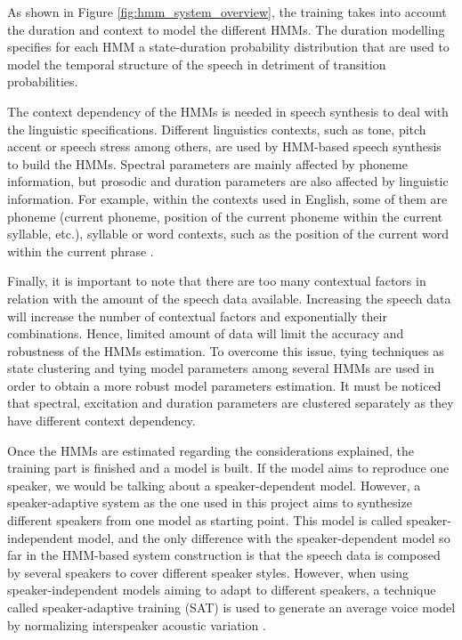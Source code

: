 As shown in Figure \ref{fig:hmm_system_overview}, the training takes into account the duration and context to model the different HMMs.
%
The duration modelling specifies for each HMM a state-duration probability distribution that are used to model the temporal structure of the speech in detriment of transition probabilities.

The context dependency of the HMMs is needed in speech synthesis to deal with the linguistic specifications.
%
Different linguistics contexts, such as tone, pitch accent or speech stress among others, are used by HMM-based speech synthesis to build the HMMs.
%
Spectral parameters are mainly affected by phoneme information, but prosodic and duration parameters are also affected by linguistic information. For example, within the contexts used in English, some of them are phoneme (current phoneme, position of the current phoneme within the current syllable, etc.), syllable or word contexts, such as the position of the current word within the current phrase \cite{tokuda13}.

Finally, it is important to note that there are too many contextual factors in relation with the amount of the speech data available. 
%
Increasing the speech data will increase the number of contextual factors and exponentially their combinations.
%
Hence, limited amount of data will limit the accuracy and robustness of the HMMs estimation.
%
To overcome this issue, tying techniques as state clustering and tying model parameters among several HMMs are used in order to obtain a more robust model parameters estimation.
%
It must be noticed that spectral, excitation and duration parameters are clustered separately as they have different context dependency.

Once the HMMs are estimated regarding the considerations explained, the training part is finished and a model is built.
%
If the model aims to reproduce one speaker, we would be talking about a speaker-dependent model.
%
However, a speaker-adaptive system as the one used in this project aims to synthesize different speakers from one model as starting point.
%
This model is called speaker-independent model, and the only difference with the speaker-dependent model so far in the HMM-based system construction is that the speech data is composed by several speakers to cover different speaker styles.
%
However, when using speaker-independent models aiming to adapt to different speakers, a technique called speaker-adaptive training (SAT) is used to generate an average voice model by normalizing interspeaker acoustic variation \cite{anastasakos1996, yamagishi2003training}.

